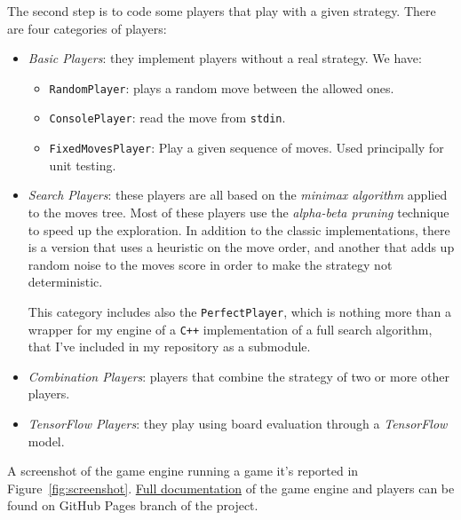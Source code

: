 \documentclass{article}
\newcommand{\ipy}[1]{\texttt{#1}}
\begin{document}
  The second step is to code some players that play with a given strategy. There are four categories of players:
  \begin{itemize}
    \item \emph{Basic Players}: they implement players without a real strategy. We have:
      \begin{itemize}
        \item \ipy{RandomPlayer}: plays a random move between the allowed ones.
        \item \ipy{ConsolePlayer}: read the move from \texttt{stdin}.
        \item \ipy{FixedMovesPlayer}: Play a given sequence of moves. Used principally for unit testing.
      \end{itemize}
    \item \emph{Search Players}: these players are all based on the \emph{minimax algorithm} applied to the moves tree.
      Most of these players use the \emph{alpha-beta pruning} technique to speed up the exploration. In addition to the classic implementations, there is a version that uses a heuristic on the move order, and another that adds up random noise to the moves score in order to make the strategy not deterministic.
      
      This category includes also the \ipy{PerfectPlayer}, which is nothing more than a wrapper for my engine of a \texttt{C++} implementation of a full search algorithm\cite{perfectsolvertutotial, perfectsolverimplementation}, that I've included in my repository as a submodule. 
    \item \emph{Combination Players}: players that combine the strategy of two or more other players.
    \item \emph{TensorFlow Players}: they play using board evaluation through a \textit{TensorFlow} model.
  \end{itemize}
  
  A screenshot of the game engine running a game it's reported in Figure~\ref{fig:screenshot}.
  \href{https://arn4.github.io/connect4/doc/}{Full documentation} of the game engine and players can be found on GitHub Pages branch of the project.
  
\end{document}
